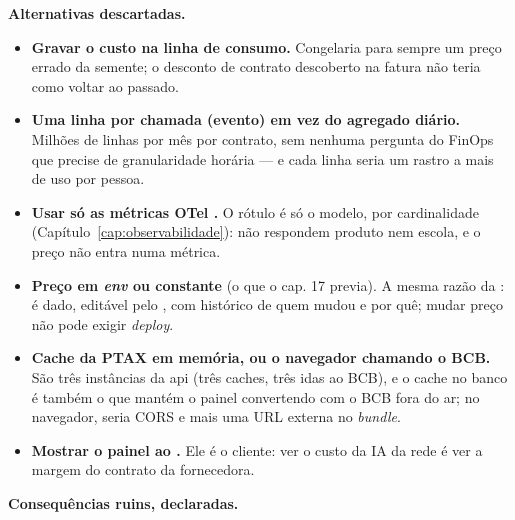 \textbf{Alternativas descartadas.}

\begin{itemize}
  \item \textbf{Gravar o custo na linha de consumo.} Congelaria para sempre um
    preço errado da semente; o desconto de contrato descoberto na fatura não
    teria como voltar ao passado.
  \item \textbf{Uma linha por chamada (evento) em vez do agregado diário.}
    Milhões de linhas por mês por contrato, sem nenhuma pergunta do FinOps que
    precise de granularidade horária --- e cada linha seria um rastro a mais de
    uso por pessoa.
  \item \textbf{Usar só as métricas OTel .} O rótulo é só o
    modelo, por cardinalidade (Capítulo~\ref{cap:observabilidade}): não
    respondem produto nem escola, e o preço não entra numa métrica.
  \item \textbf{Preço em \emph{env} ou constante} (o 
    que o cap. 17 previa). A mesma razão da : é dado, editável
    pelo , com histórico de quem mudou e por quê; mudar preço não pode
    exigir \emph{deploy}.
  \item \textbf{Cache da PTAX em memória, ou o navegador chamando o BCB.} São
    três instâncias da api (três caches, três idas ao BCB), e o cache no banco é
    também o que mantém o painel convertendo com o BCB fora do ar; no navegador,
    seria CORS e mais uma URL externa no \emph{bundle}.
  \item \textbf{Mostrar o painel ao .} Ele é o cliente:
    ver o custo da IA da rede é ver a margem do contrato da fornecedora.
\end{itemize}

\textbf{Consequências ruins, declaradas.}


